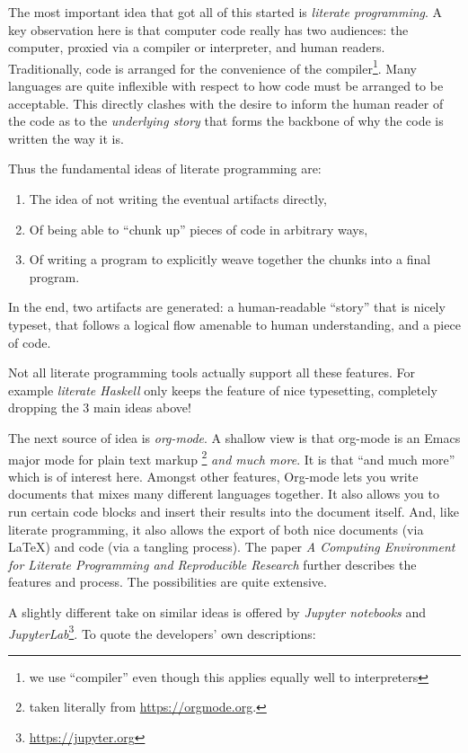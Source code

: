 \documentclass[sigconf,review]{acmart}
\begin{document}
The most important idea that got all of this started is
\emph{literate programming}\cite{Knuth1984}. A key observation here
is that computer code really has two audiences: the computer, proxied
via a compiler or interpreter, and human readers. Traditionally, code
is arranged for the convenience of the compiler\footnote{we use ``compiler''
even though this applies equally well to interpreters}. Many languages
are quite inflexible with respect to how code must be arranged to be
acceptable. This directly clashes with the desire to inform the
human reader of the code as to the \emph{underlying story} that forms the
backbone of why the code is written the way it is.

Thus the fundamental ideas of literate programming are:
\begin{enumerate}
\item The idea of not writing the eventual artifacts directly,
\item Of being able to ``chunk up'' pieces of code in arbitrary
ways,
\item Of writing a program to explicitly weave together the chunks
into a final program.
\end{enumerate}
In the end, two artifacts are generated: a human-readable ``story'' that
is nicely typeset, that follows a logical flow amenable to human understanding,
and a piece of code.

Not all literate programming tools actually support all these features.
For example \emph{literate Haskell} only keeps the feature of nice typesetting,
completely dropping the $3$ main ideas above!

The next source of idea is \emph{org-mode}\cite{org-mode}. A shallow view
is that org-mode is an Emacs major mode for plain text markup%
\footnote{taken literally from \url{https://orgmode.org}.}
\emph{and much more}.  It is that ``and much more'' which is of interest
here. Amongst other features, Org-mode lets you write documents that mixes many
different languages together. It also allows you to run certain code blocks
and insert their results into the document itself. And, like literate
programming, it also allows the export of both nice documents
(via \LaTeX) and code (via a tangling process). The paper
\textit{A Computing Environment for Literate Programming and
Reproducible Research}\cite{SchulteEtAl2012} further describes the features
and process. The possibilities are quite extensive.

A slightly different take on similar ideas is offered by
\emph{Jupyter notebooks} and 
\emph{JupyterLab}\footnote{\url{https://jupyter.org}}. To quote the
developers' own descriptions:
\end{document}
